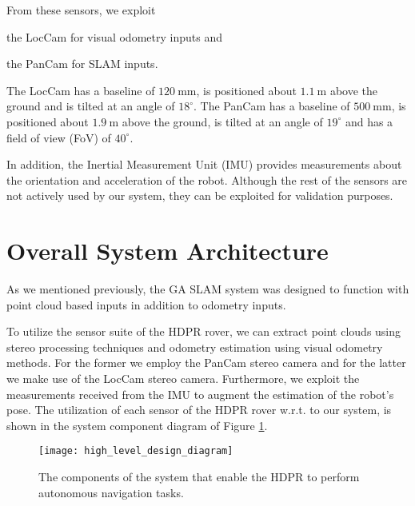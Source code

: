 From these sensors, we exploit
\begin{enumerate*}[label=(\roman*)]
    \item the LocCam for visual odometry inputs and
    \item the PanCam for SLAM inputs.
\end{enumerate*}
The LocCam has a baseline of $\SI{120}{\mm}$, is positioned about
$\SI{1.1}{\m}$ above the ground and is tilted at an angle of $18^{\circ}$.
The PanCam has a baseline of $\SI{500}{\mm}$, is positioned about
$\SI{1.9}{\m}$ above the ground, is tilted at an angle of $19^{\circ}$ and
has a field of view (FoV) of $40^{\circ}$.

In addition, the Inertial Measurement Unit (IMU) provides measurements about
the orientation and acceleration of the robot.
Although the rest of the sensors are not actively used by our system,
they can be exploited for validation purposes.



\section{Overall System Architecture}

As we mentioned previously, the GA SLAM system was designed to function
with point cloud based inputs in addition to odometry inputs.

To utilize the sensor suite of the HDPR rover, we can extract point clouds
using stereo processing techniques and odometry estimation using visual
odometry methods.
For the former we employ the PanCam stereo camera and for the latter we make
use of the LocCam stereo camera.
Furthermore, we exploit the measurements received from the IMU to augment
the estimation of the robot's pose.
The utilization of each sensor of the HDPR rover w.r.t. to our system,
is shown in the system component diagram of Figure
\ref{fig:system_component_diagram}.

\begin{figure}[h!]
    \centering
    \texttt{[image: high\_level\_design\_diagram]}
    \decoRule
    \caption[System component diagram]{
        The components of the system that enable the HDPR to perform
        autonomous navigation tasks.
    }
    \label{fig:system_component_diagram}
\end{figure}

